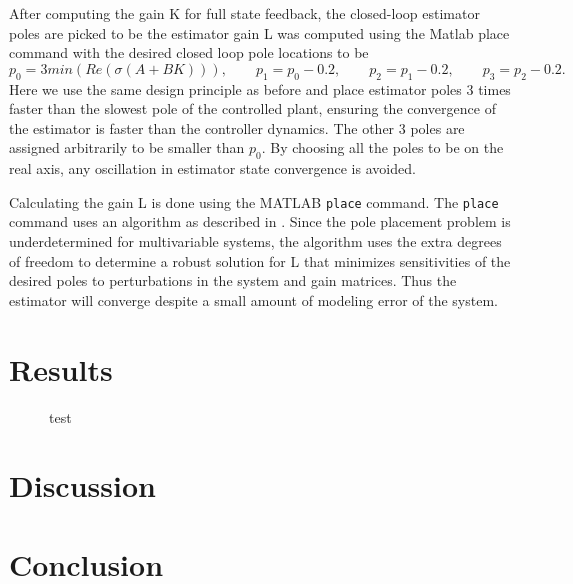 \documentclass[letterpaper,11pt]{article}
\begin{document}
After computing the gain K for full state feedback, the closed-loop estimator poles are picked to be
the estimator gain L was computed using the Matlab place command with the
desired closed loop pole locations to be
\begin{equation*}
p_0 = 3 min\left(Re\left(\sigma\left(A + BK\right)\right)\right),
\qquad
p_1 = p_0 - 0.2,
\qquad
p_2 = p_1 - 0.2,
\qquad
p_3 = p_2 - 0.2.
\end{equation*}
Here we use the same design principle as before and place estimator poles 3
times faster than the slowest pole of the controlled plant, ensuring the
convergence of the estimator is faster than the controller dynamics. The other
3 poles are assigned arbitrarily to be smaller than $p_0$.  By choosing all the
poles to be on the real axis, any oscillation in estimator state convergence is
avoided.

Calculating the gain L is done using the MATLAB \verb|place| command. The \verb|place|
command uses an algorithm as described in \cite{Kautsky1985}. Since the pole
placement problem is underdetermined for multivariable systems, the algorithm
uses the extra degrees of freedom to determine a robust solution for L that
minimizes sensitivities of the desired poles to perturbations in the system and
gain matrices. Thus the estimator will converge despite a small amount of
modeling error of the system.


\section{Results} \label{sec:results}
\begin{figure}
  \pgfplotsset{set layers}
  \runzero
  \centering
  \caption{test}
  \label{rb:fig:run000a}
\end{figure}

\section{Discussion} \label{sec:discussion}

\section{Conclusion} \label{sec:conclusion}

\printbibliography
\end{document}

